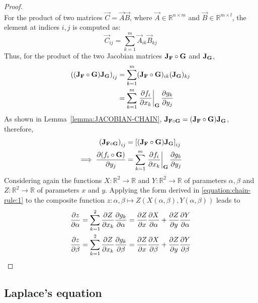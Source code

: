 \begin{lemma}
\begin{proof}
$$        $$
        For the product of two matrices $\vec{C}=\vec{A}\vec{B}$, where $\vec{A}\in\mathbb{R}^{n\times m}$ and $\vec{B}\in\mathbb{R}^{m\times l}$, the element at indices $i,j$ is computed as: 
        $$
            \vec{C}_{ij}=\sum_{k=1}^{m}\vec{A}_{ik}\vec{B}_ {kj}
        $$
        Thus, for the product of the two Jacobian matrices $\mathbf{J}_{\mathbf{F}}\circ\mathbf{G}$ and $\mathbf{J}_{\mathbf{G}}$,
        \begin{align*}
            \left((\jacobian_\fatf\circ\vec{G})\jacobian_\vec{G}\right)_{ij}&=\sum_{k=1}^{m}(\jacobian_\fatf\circ\vec{G})_{ik}(\jacobian_\vec{G})_{kj}\\
            &=\sum_{k=1}^{m}\eval{\pdv{f_i}{x_k}}_\vec{G}\pdv{g_k}{y_j}
        \end{align*}
        As shown in Lemma~\ref{lemma:JACOBIAN-CHAIN}, $\mathbf{J}_{\mathbf{F}\circ\mathbf{G}}=(\mathbf{J}_{\mathbf{F}}\circ\mathbf{G})\mathbf{J}_{\mathbf{G}}$, therefore,
        \begin{align}
            \notag\left(\jacobian_{\fatf\circ\vec{G}}\right)_{ij}&=\left[(\jacobian_\fatf\circ\vec{G})\jacobian_\vec{G}\right]_{ij}\\
            \label{equation:chain-rule:1}\implies\pdv{(f_i\circ\vec{G})}{y_j}&=\sum_{k=1}^{m}\eval{\pdv{f_i}{x_k}}_\vec{G}\pdv{g_k}{y_j}
        \end{align}
        Considering again the functions $X:\mathbb{R}^2\rightarrow\mathbb{R}$ and $Y:\mathbb{R}^2\rightarrow\mathbb{R}$ of parameters $\alpha,\beta$ and $Z:\mathbb{R}^2\rightarrow\mathbb{R}$ of parameters $x$ and $y$.
        Applying the form derived in \eqref{equation:chain-rule:1} to the composite function $z:\alpha,\beta\mapsto Z(X(\alpha,\beta),Y(\alpha,\beta))$ leads to
        \begin{align*}
            \pdv{z}{\alpha}&=\sum_{k=1}^{2}\pdv{Z}{x_k}\pdv{g_k}{\alpha}=\pdv{Z}{x}\pdv{X}{\alpha}+\pdv{Z}{y}\pdv{Y}{\alpha}\\
            \pdv{z}{\beta}&=\sum_{k=1}^{2}\pdv{Z}{x_k}\pdv{g_k}{\beta}=\pdv{Z}{x}\pdv{X}{\beta}+\pdv{Z}{y}\pdv{Y}{\beta}
        \end{align*}
    \end{proof}
\end{lemma}

\subsection{Laplace's equation}
